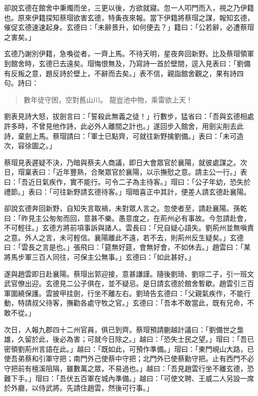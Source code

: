 卻說玄德在館舍中秉燭而坐，三更以後，方欲就寢。忽一人叩門而入，視之乃伊籍也。原來伊籍探知蔡瑁欲害玄德，特夤夜來報。當下伊籍將蔡瑁之謀，報知玄德，催促玄德速速起身。玄德曰：「未辭景升，如何便去？」籍曰：「公若辭，必遭蔡瑁之害矣。」

玄德乃謝別伊籍，急喚從者，一齊上馬。不待天明，星夜奔回新野。比及蔡瑁領軍到館舍時，玄德已去遠矣。瑁悔恨無及，乃寫詩一首於壁間，逕入見表曰：「劉備有反叛之意，題反詩於壁上，不辭而去矣。」表不信，親詣館舍觀之，果有詩四句。詩曰：

\begin{quote}
數年徒守困，空對舊山川。
龍豈池中物，乘雷欲上天！
\end{quote}

劉表見詩大怒，拔劍言曰：「誓殺此無義之徒！」行數步，猛省曰：「吾與玄德相處許多時，不曾見他作詩，此必外人離間之計也。」遂回步入館舍，用劍尖削去此詩，棄劍上馬。蔡瑁請曰：「軍士已點齊，可就往新野擒劉備。」表曰：「未可造次，容徐圖之。」

蔡瑁見表遲疑不決，乃暗與蔡夫人商議，即日大會眾官於襄陽，就彼處謀之。次日，瑁稟表曰：「近年豐熟，合聚眾官於襄陽，以示撫慰之意。請主公一行。」表曰：「吾近日氣疾作，實不能行。可令二子為主待客。」瑁曰：「公子年幼，恐失於禮節。」表曰：「可往新野請玄德待客。」瑁暗喜正中其計，便差人請玄德赴襄陽。

卻說玄德奔回新野，自知失言取禍，未對眾人言之。忽使者至，請赴襄陽。孫乾曰：「昨見主公匆匆而回，意甚不樂。愚意度之，在荊州必有事故。今忽請赴會，不可輕往。」玄德方將前項事訴與諸人。雲長曰：「兄自疑心語失。劉荊州並無嗔責之意。外人之言，未可輕信。襄陽離此不遠，若不去，則荊州反生疑矣。」玄德曰：「雲長之言是也。」張飛曰：「筵無好筵，會無好會，不如休去。」趙雲曰：「某將馬步軍三百人同往，可保主公無事。」玄德曰：「如此甚好。」

遂與趙雲即日赴襄陽。蔡瑁出郭迎接，意甚謙謹。隨後劉琦、劉琮二子，引一班文武官僚出迎。玄德見二公子俱在，並不疑忌。是日請玄德於館舍暫歇。趙雲引三百軍圍繞保護。雲披甲挂劍，行坐不離左右。劉琦告玄德曰：「父親氣疾作，不能行動，特請叔父待客，撫勸各處守牧之官。」玄德曰：「吾本不敢當此，既有兄命，不敢不從。」

次日，人報九郡四十二州官員，俱已到齊。蔡瑁預請蒯越計議曰：「劉備世之梟雄，久留於此，後必為害；可就今日除之。」越曰：「恐失士民之望。」瑁曰：「吾已密領劉荊州言語在此。」越曰：「既如此，可預作準備。」瑁曰：「東門峴山大路，已使吾弟蔡和引軍守把；南門外己使蔡中守把；北門外已使蔡勳守把。止有西門不必守把前有檀溪阻隔，雖數萬之眾，不易過也。」越曰：「吾見趙雲行坐不離玄德，恐難下手。」瑁曰：「吾伏五百軍在城內準備。」越曰：「可使文聘、王威二人另設一席於外廳，以侍武將。先請住趙雲，然後可行事。」

